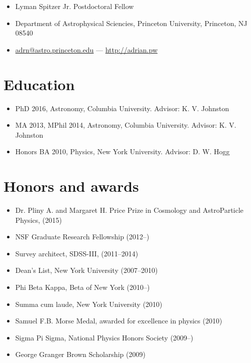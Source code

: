 \documentclass[12pt,letterpaper]{article}
\begin{document}
\thispagestyle{empty}\sloppy\sloppypar

{\huge \name}
\vspace{-0.25em}

\begin{itemize}
  \item Lyman Spitzer Jr. Postdoctoral Fellow
  \item Department of Astrophysical Sciencies, Princeton University, Princeton, NJ 08540
  \item \href{mailto:adrn@astro.princeton.edu}{adrn@astro.princeton.edu} ---
		\href{http://adrian.pw}{http://adrian.pw}
\end{itemize}

\section*{Education}
	\begin{itemize}
	\item PhD 2016, Astronomy, Columbia University.
		{Advisor: K. V. Johnston}
	\item MA 2013, MPhil 2014, Astronomy, Columbia University.
		{Advisor: K. V. Johnston}
	\item Honors BA 2010, Physics, New York University.
		{Advisor: D. W. Hogg}
	\end{itemize}


\section*{Honors and awards}

	\begin{itemize}
    \item Dr. Pliny A. and Margaret H. Price Prize in Cosmology and AstroParticle Physics, (2015)
	\item NSF Graduate Research Fellowship (2012--)
	\item Survey architect, SDSS-III, (2011--2014)
	\item Dean's List, New York University (2007--2010)
	\item Phi Beta Kappa, Beta of New York (2010--)
	\item Summa cum laude, New York University (2010)
	\item Samuel F.B. Morse Medal, awarded for excellence in physics (2010)
	\item Sigma Pi Sigma, National Physics Honors Society (2009--)
	\item George Granger Brown Scholarship (2009)
	\end{itemize}
\end{document}
